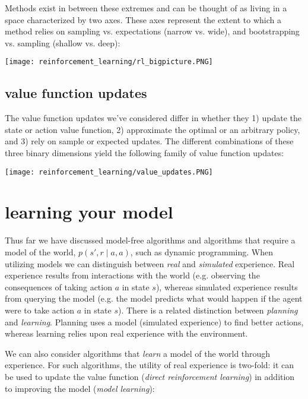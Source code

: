 Methods exist in between these extremes and can be thought of as living in a space characterized by two axes. These axes represent the extent to which a method relies on sampling vs. expectations (narrow vs. wide), and bootstrapping vs. sampling (shallow vs. deep):

\begin{center}\texttt{[image: reinforcement\_learning/rl\_bigpicture.PNG]}\end{center}

\subsection{value function updates}
The value function updates we've considered differ in whether they 1) update the state or action value function, 2) approximate the optimal or an arbitrary policy, and 3) rely on sample or expected updates. The different combinations of these three binary dimensions yield the following family of value function updates:

\begin{center}\texttt{[image: reinforcement\_learning/value\_updates.PNG]}\end{center}

\section{learning your model}
Thus far we have discussed model-free algorithms and algorithms that require a model of the world, $p(s',r \mid a,a)$, such as dynamic programming. When utilizing models we can distinguish between \textit{real} and \textit{simulated} experience. Real experience results from interactions with the world (e.g. observing the consequences of taking action $a$ in state $s$), whereas simulated experience results from querying the model (e.g. the model predicts what would happen if the agent were to take action $a$ in state $s$). There is a related distinction between \textit{planning} and \textit{learning}. Planning uses a model (simulated experience) to find better actions, whereas learning relies upon real experience with the environment.

We can also consider algorithms that \textit{learn} a model of the world through experience. For such algorithms, the utility of real experience is two-fold: it can be used to update the value function (\textit{direct reinforcement learning}) in addition to improving the model (\textit{model learning}):

